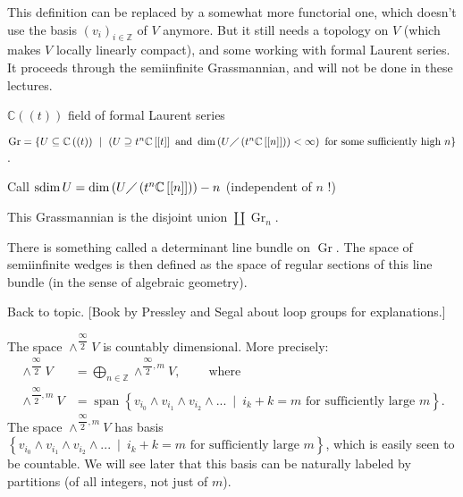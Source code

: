 \documentclass
[numbers=enddot,12pt,final,onecolumn,german,notitlepage]{scrartcl}%
\theoremstyle{definition}
\begin{document}
This definition can be replaced by a somewhat more functorial one, which
doesn't use the basis $\left(  v_{i}\right)  _{i\in\mathbb{Z}}$ of $V$
anymore. But it still needs a topology on $V$ (which makes $V$ locally
linearly compact), and some working with formal Laurent series. It proceeds
through the semiinfinite Grassmannian, and will not be done in these lectures.

$\mathbb{C}\left(  \left(  t\right)  \right)  $ field of formal Laurent series

$\operatorname*{Gr}=\left\{  U\subseteq\mathbb{C}\left(  \left(  t\right)
\right)  \ \mid\ \left(  U\supseteq t^{n}\mathbb{C}\left[  \left[  t\right]
\right]  \text{ and }\dim\left(  U\diagup\left(  t^{n}\mathbb{C}\left[
\left[  n\right]  \right]  \right)  \right)  <\infty\right)  \text{ for some
sufficiently high }n\right\}  $.

Call $\operatorname*{sdim}U=\dim\left(  U\diagup\left(  t^{n}\mathbb{C}\left[
\left[  n\right]  \right]  \right)  \right)  -n$ (independent of $n$ !)

This Grassmannian is the disjoint union $\coprod\operatorname*{Gr}%
\nolimits_{n}$.

There is something called a determinant line bundle on $\operatorname*{Gr}$.
The space of semiinfinite wedges is then defined as the space of regular
sections of this line bundle (in the sense of algebraic geometry).

Back to topic. [Book by Pressley and Segal about loop groups for explanations.]

The space $\wedge^{\dfrac{\infty}{2}}V$ is countably dimensional. More
precisely:%
\begin{align*}
\wedge^{\dfrac{\infty}{2}}V  &  =\bigoplus\limits_{n\in\mathbb{Z}}%
\wedge^{\dfrac{\infty}{2},m}V,\ \ \ \ \ \ \ \ \ \ \text{where}\\
\wedge^{\dfrac{\infty}{2},m}V  &  =\operatorname*{span}\left\{  v_{i_{0}%
}\wedge v_{i_{1}}\wedge v_{i_{2}}\wedge...\ \mid\ i_{k}+k=m\text{ for
sufficiently large }m\right\}  .
\end{align*}
The space $\wedge^{\dfrac{\infty}{2},m}V$ has basis $\left\{  v_{i_{0}}\wedge
v_{i_{1}}\wedge v_{i_{2}}\wedge...\ \mid\ i_{k}+k=m\text{ for sufficiently
large }m\right\}  $, which is easily seen to be countable. We will see later
that this basis can be naturally labeled by partitions (of all integers, not
just of $m$).
\end{document}
